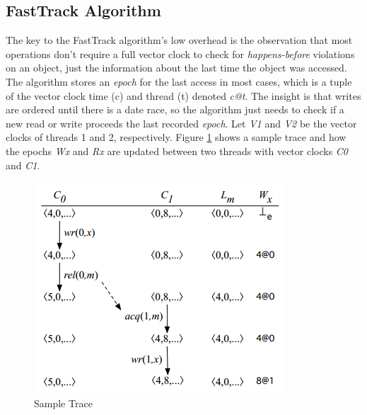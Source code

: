 \documentclass{acm_proc_article-sp}
\begin{document}
\subsection{FastTrack Algorithm}
The key to the FastTrack algorithm's low overhead is the observation that most operations don't require a full vector clock to check for \emph{happens-before} violations on an object, just the information about the last time the object was accessed. The algorithm stores an \emph{epoch} for the last access in most cases, which is a tuple of the vector clock time (c)  and thread (t) denoted \emph{c@t}. The insight is that writes are ordered until there is a date race, so the algorithm just needs to check if a new read or write proceeds the last recorded \emph{epoch}. Let\emph{ V1} and \emph{V2} be the vector clocks of threads 1 and 2, respectively.
Figure \ref{trace} shows a sample trace and how the epochs \emph{Wx} and \emph{Rx} are updated between two threads with vector clocks \emph{C0} and \emph{C1}.
 \begin{figure}[h]
    \centering
      \includegraphics[scale=.5]{full_trace_new}
      \caption{Sample Trace\label{trace}}
  \end{figure} 
\end{document}
